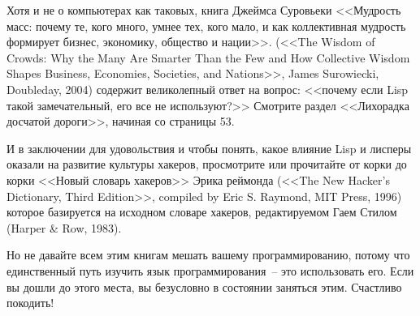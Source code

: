 Хотя и не о компьютерах как таковых, книга Джеймса Суровьеки <<Мудрость масс: почему те,
кого много, умнее тех, кого мало, и как коллективная мудрость формирует бизнес, экономику,
общество и нации>>. (<<The Wisdom of Crowds: Why the Many Are Smarter Than the Few and How
Collective Wisdom Shapes Business, Economies, Societies, and Nations>>, James Surowiecki,
Doubleday, 2004) содержит великолепный ответ на вопрос: <<почему если Lisp такой
замечательный, его все не используют?>> Смотрите раздел <<Лихорадка досчатой дороги>>,
начиная со страницы 53.

И в заключении для удовольствия и чтобы понять, какое влияние Lisp и лисперы оказали на
развитие культуры хакеров, просмотрите или прочитайте от корки до корки <<Новый словарь
хакеров>> Эрика реймонда (<<The New Hacker's Dictionary, Third Edition>>, compiled by Eric
S. Raymond, MIT Press, 1996) которое базируется на исходном словаре хакеров, редактируемом
Гаем Стилом (Harper \& Row, 1983).

Но не давайте всем этим книгам мешать вашему программированию, потому что единственный
путь изучить язык программирования~-- это использовать его. Если вы дошли до этого места,
вы безусловно в состоянии заняться этим.  Счастливо покодить!


